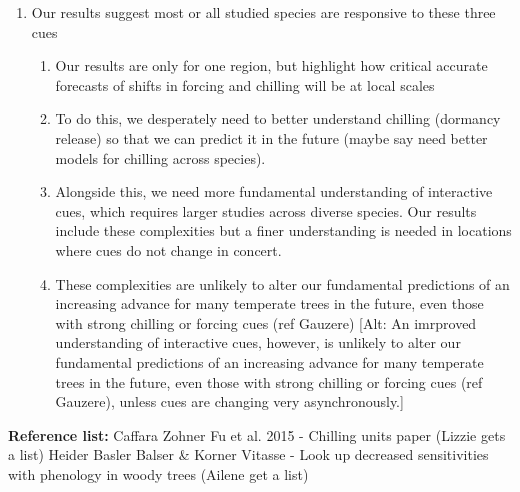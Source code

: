 \documentclass[11pt,letter]{article}
\begin{document}
\begin{enumerate}
\begin{enumerate}
\end{enumerate}
\item Our results suggest most or all studied species are responsive to these three cues
\begin{enumerate}
\item Our results are only for one region, but highlight how critical accurate forecasts of shifts in forcing and chilling will be at local scales
\item To do this, we desperately need to better understand chilling (dormancy release) so that we can predict it in the future (maybe say need better models for chilling across species). 
\item Alongside this, we need more fundamental understanding of interactive cues, which requires larger studies across diverse species. Our results include these complexities but a finer understanding is needed in locations where cues do not change in concert.
\item These complexities are unlikely to alter our fundamental predictions of an increasing advance for many temperate trees in the future, even those with strong chilling or forcing cues (ref Gauzere) [Alt: An imrproved understanding of interactive cues, however, is unlikely to alter our fundamental predictions of an increasing advance for many temperate trees in the future, even those with strong chilling or forcing cues (ref Gauzere), unless cues are changing very asynchronously.]
\end{enumerate}
\end{enumerate}

{\bf Reference list:}
Caffara
Zohner
Fu et al. 2015
- Chilling units paper (Lizzie gets a list)
Heider
Basler
Balser \& Korner
Vitasse 
- Look up decreased sensitivities with phenology in woody trees (Ailene get a list)
\end{document}
